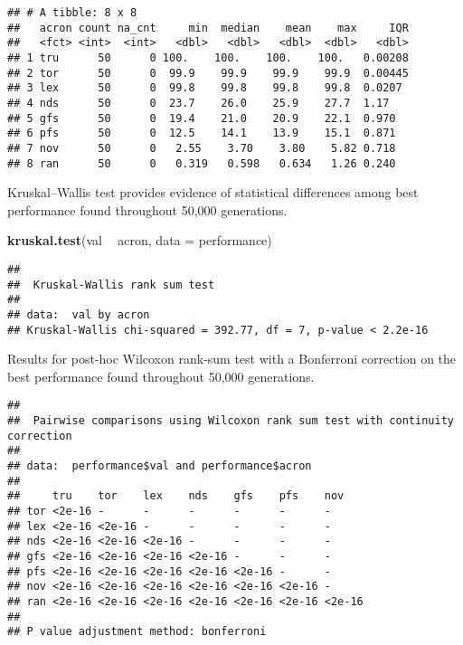 \documentclass[]{book}
\newenvironment{Shaded}{\begin{snugshade}}{\end{snugshade}}
\newcommand{\DataTypeTok}[1]{\textcolor[rgb]{0.13,0.29,0.53}{#1}}
\newcommand{\KeywordTok}[1]{\textcolor[rgb]{0.13,0.29,0.53}{\textbf{#1}}}
\newcommand{\NormalTok}[1]{#1}
\newcommand{\OperatorTok}[1]{\textcolor[rgb]{0.81,0.36,0.00}{\textbf{#1}}}
\newcommand{\OtherTok}[1]{\textcolor[rgb]{0.56,0.35,0.01}{#1}}
\newcommand{\StringTok}[1]{\textcolor[rgb]{0.31,0.60,0.02}{#1}}
\begin{document}
\begin{verbatim}
## # A tibble: 8 x 8
##   acron count na_cnt     min  median    mean    max     IQR
##   <fct> <int>  <int>   <dbl>   <dbl>   <dbl>  <dbl>   <dbl>
## 1 tru      50      0 100.    100.    100.    100.   0.00208
## 2 tor      50      0  99.9    99.9    99.9    99.9  0.00445
## 3 lex      50      0  99.8    99.8    99.8    99.8  0.0207 
## 4 nds      50      0  23.7    26.0    25.9    27.7  1.17   
## 5 gfs      50      0  19.4    21.0    20.9    22.1  0.970  
## 6 pfs      50      0  12.5    14.1    13.9    15.1  0.871  
## 7 nov      50      0   2.55    3.70    3.80    5.82 0.718  
## 8 ran      50      0   0.319   0.598   0.634   1.26 0.240
\end{verbatim}

Kruskal--Wallis test provides evidence of statistical differences among best performance found throughout 50,000 generations.

\begin{Shaded}
\begin{Highlighting}[]
\KeywordTok{kruskal.test}\NormalTok{(val }\OperatorTok{~}\StringTok{ }\NormalTok{acron, }\DataTypeTok{data =}\NormalTok{ performance)}
\end{Highlighting}
\end{Shaded}

\begin{verbatim}
## 
##  Kruskal-Wallis rank sum test
## 
## data:  val by acron
## Kruskal-Wallis chi-squared = 392.77, df = 7, p-value < 2.2e-16
\end{verbatim}

Results for post-hoc Wilcoxon rank-sum test with a Bonferroni correction on the best performance found throughout 50,000 generations.

\begin{Shaded}
\end{Shaded}

\begin{verbatim}
## 
##  Pairwise comparisons using Wilcoxon rank sum test with continuity correction 
## 
## data:  performance$val and performance$acron 
## 
##     tru    tor    lex    nds    gfs    pfs    nov   
## tor <2e-16 -      -      -      -      -      -     
## lex <2e-16 <2e-16 -      -      -      -      -     
## nds <2e-16 <2e-16 <2e-16 -      -      -      -     
## gfs <2e-16 <2e-16 <2e-16 <2e-16 -      -      -     
## pfs <2e-16 <2e-16 <2e-16 <2e-16 <2e-16 -      -     
## nov <2e-16 <2e-16 <2e-16 <2e-16 <2e-16 <2e-16 -     
## ran <2e-16 <2e-16 <2e-16 <2e-16 <2e-16 <2e-16 <2e-16
## 
## P value adjustment method: bonferroni
\end{verbatim}
\end{document}
